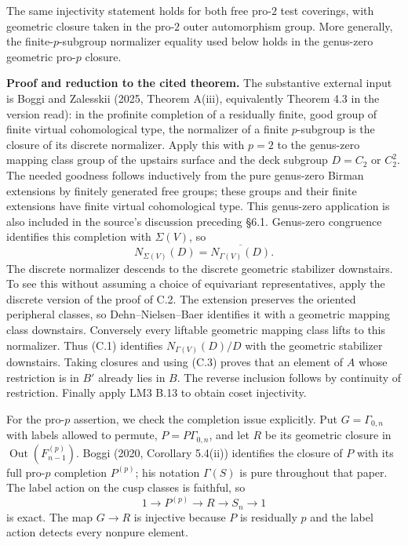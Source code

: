 \documentclass[10pt,a4paper]{article}
\begin{document}
The same injectivity statement holds for both free pro-\(2\) test coverings, with geometric closure taken in the pro-\(2\) outer automorphism group. More generally, the finite-\(p\)-subgroup normalizer equality used below holds in the genus-zero geometric pro-\(p\) closure.

\textbf{Proof and reduction to the cited theorem.} The substantive external input is Boggi and Zalesskii (2025, Theorem A(iii), equivalently Theorem 4.3 in the version read): in the profinite completion of a residually finite, good group of finite virtual cohomological type, the normalizer of a finite \(p\)-subgroup is the closure of its discrete normalizer. Apply this with \(p=2\) to the genus-zero mapping class group of the upstairs surface and the deck subgroup \(D=C_2\) or \(C_2^2\). The needed goodness follows inductively from the pure genus-zero Birman extensions by finitely generated free groups; these groups and their finite extensions have finite virtual cohomological type. This genus-zero application is also included in the source's discussion preceding \S{}6.1. Genus-zero congruence identifies this completion with \(\Sigma(V)\), so \[
 N_{\Sigma(V)}(D)=\overline{N_{\Gamma(V)}(D)}.           \tag{C.3}
\] The discrete normalizer descends to the discrete geometric stabilizer downstairs. To see this without assuming a choice of equivariant representatives, apply the discrete version of the proof of C.2. The extension preserves the oriented peripheral classes, so Dehn--Nielsen--Baer identifies it with a geometric mapping class downstairs. Conversely every liftable geometric mapping class lifts to this normalizer. Thus (C.1) identifies \(N_{\Gamma(V)}(D)/D\) with the geometric stabilizer downstairs. Taking closures and using (C.3) proves that an element of \(A\) whose restriction is in \(B'\) already lies in \(B\). The reverse inclusion follows by continuity of restriction. Finally apply LM3 B.13 to obtain coset injectivity.

For the pro-\(p\) assertion, we check the completion issue explicitly. Put \(G=\Gamma_{0,n}\) with labels allowed to permute, \(P=P\Gamma_{0,n}\), and let \(R\) be its geometric closure in \(\operatorname{Out}(F_{n-1}^{(p)})\). Boggi (2020, Corollary 5.4(ii)) identifies the closure of \(P\) with its full pro-\(p\) completion \(P^{(p)}\); his notation \(\Gamma(S)\) is pure throughout that paper. The label action on the cusp classes is faithful, so \[
 1\to P^{(p)}\to R\to S_n\to1
\] is exact. The map \(G\to R\) is injective because \(P\) is residually \(p\) and the label action detects every nonpure element.
\end{document}
